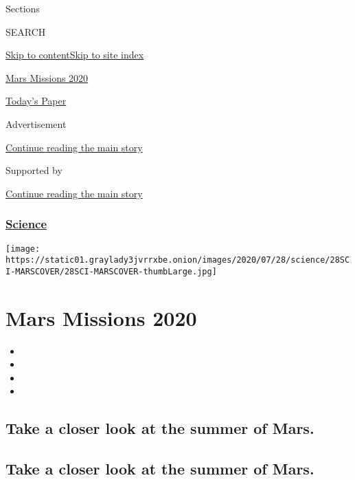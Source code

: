 Sections

SEARCH

\protect\hyperlink{site-content}{Skip to
content}\protect\hyperlink{site-index}{Skip to site index}

\href{https://www.nytimes3xbfgragh.onion/news-event/summer-of-mars}{Mars
Missions 2020}

\href{https://myaccount.nytimes3xbfgragh.onion/auth/login?response_type=cookie\&client_id=vi}{}

\href{https://www.nytimes3xbfgragh.onion/section/todayspaper}{Today's
Paper}

Advertisement

\protect\hyperlink{after-top}{Continue reading the main story}

Supported by

\protect\hyperlink{after-sponsor}{Continue reading the main story}

\hypertarget{science}{%
\subsubsection{\texorpdfstring{\href{/section/science}{Science}}{Science}}\label{science}}

\texttt{[image: https://static01.graylady3jvrrxbe.onion/images/2020/07/28/science/28SCI-MARSCOVER/28SCI-MARSCOVER-thumbLarge.jpg]}

\hypertarget{mars-missions-2020}{%
\section{Mars Missions 2020}\label{mars-missions-2020}}

\begin{itemize}
\item
\item
\item
\item
\end{itemize}

\hypertarget{take-a-closer-look-at-the-summer-of-mars}{%
\subsection{Take a closer look at the summer of
Mars.}\label{take-a-closer-look-at-the-summer-of-mars}}

\hypertarget{take-a-closer-look-at-the-summer-of-mars-1}{%
\subsection{Take a closer look at the summer of
Mars.}\label{take-a-closer-look-at-the-summer-of-mars-1}}


